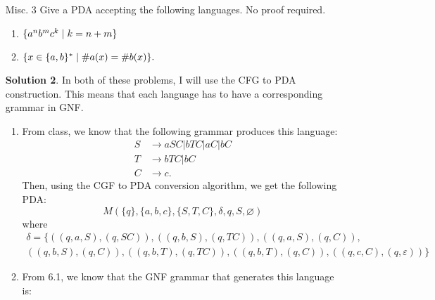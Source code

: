 \documentclass{article}
\newcommand{\es}{\varnothing}
\newcommand{\setst}{\hspace{1mm} | \hspace{1mm} }
\renewcommand{\epsilon}{\varepsilon}
\theoremstyle{definition}
\newtheorem*{solution*}{Solution}
\begin{document}
\begin{enumerate}
\begin{solution*}
\begin{enumerate}
		Case 2: $vwx$ is of the form $a^mb^n$ where $m + n \leq k$. There is no possible way for a string of the form $a^mb^na^p$ since there are $k$ $b$'s in a row. In particular, $v$ must contain $a$'s and $x$ must contain $b$'s. If either $v$ or $x$ is empty, then we degenerate to Case 1. Then, if we choose $i \geq 2$, we get three cases. First, we get $uv^2wx^2y =  a^{k+s}b^{k+t}a^kb^k$ where $s+t > 0$ which is not in $L_2$. Second, we could get $a^kb^ka^{k+s}b^{k+s}$ where $s + t > 0$. Finally, it is also a possibility that if $v$ has both $a$'s and $b$'s, then after pumping, will be too many switches between $a$'s and $b$'s (more than 3) so the string will not be in the language. A similar thing can happen if $x$ contains $a$'s and $b$'s as well. 
		
		There is a practically similar case when $vwx$ is of the form $b^ma^n$ where $m + n \leq k$. We have shown that $L_2$ is not context-free.
	\end{enumerate}
\end{solution*}
\item[Misc. 3] Give a PDA accepting the following languages.  No proof required.
\begin{enumerate}
\item  $\{a^n b^m c^k \setst k = n + m\}$ 
\item $\{x \in \{a,b\}^* \setst \#a(x) = \#b(x)\}.$ 
\end{enumerate}
\begin{solution*}
	In both of these problems, I will use the CFG to PDA construction. This means that each language has to have a corresponding grammar in GNF. 
	\begin{enumerate}
		\item From class, we know that the following grammar produces this language:
		\begin{align*}
		S &\rightarrow aSC | bTC | aC | bC \\
		T &\rightarrow bTC | bC \\
		C & \rightarrow c.
		\end{align*}
		Then, using the CGF to PDA conversion algorithm, we get the following PDA:
		\[M \left(\{q\},\{a,b,c\},\{S,T,C\},\delta,q,S,\es\right)\]
		where 
		\begin{multline*}
		\delta = \{((q,a,S),(q,SC)),((q,b,S),(q,TC)),((q,a,S),(q,C)),\\((q,b,S),(q,C)),((q,b,T),(q,TC)),((q,b,T),(q,C)),((q,c,C),(q,\epsilon))\}
		\end{multline*}
		\item From 6.1, we know that the GNF grammar that generates this language is:

\end{enumerate}
\end{solution*}
\end{enumerate}
\end{document}
